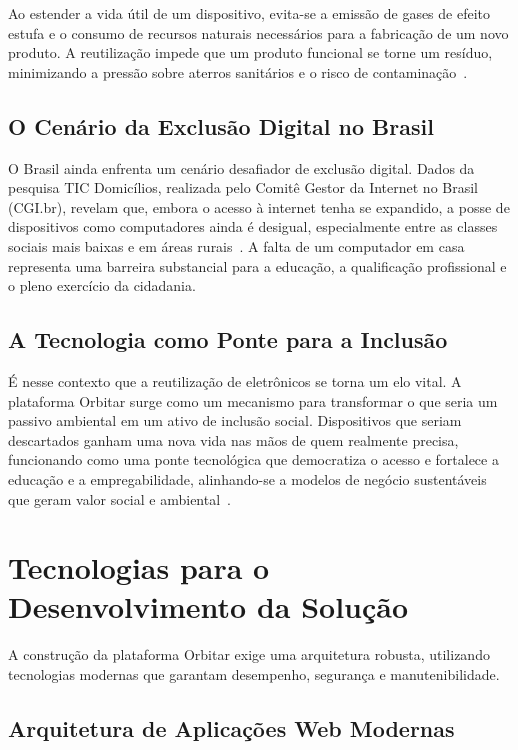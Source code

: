 \documentclass[
	12pt,				%
	openright,			%
	oneside,			%
	a4paper,			%
	english,			%
	brazil				%
	]{abntex2}
\theoremstyle{definition}
\begin{document}
Ao estender a vida útil de um dispositivo, evita-se a emissão de gases de efeito estufa e o consumo de recursos naturais necessários para a fabricação de um novo produto. A reutilização impede que um produto funcional se torne um resíduo, minimizando a pressão sobre aterros sanitários e o risco de contaminação~\cite{Kirchherr2017}.

\subsection{O Cenário da Exclusão Digital no Brasil}

O Brasil ainda enfrenta um cenário desafiador de exclusão digital. Dados da pesquisa TIC Domicílios, realizada pelo Comitê Gestor da Internet no Brasil (CGI.br), revelam que, embora o acesso à internet tenha se expandido, a posse de dispositivos como computadores ainda é desigual, especialmente entre as classes sociais mais baixas e em áreas rurais~\cite{cgi2024}. A falta de um computador em casa representa uma barreira substancial para a educação, a qualificação profissional e o pleno exercício da cidadania.

\subsection{A Tecnologia como Ponte para a Inclusão}

É nesse contexto que a reutilização de eletrônicos se torna um elo vital. A plataforma Orbitar surge como um mecanismo para transformar o que seria um passivo ambiental em um ativo de inclusão social. Dispositivos que seriam descartados ganham uma nova vida nas mãos de quem realmente precisa, funcionando como uma ponte tecnológica que democratiza o acesso e fortalece a educação e a empregabilidade, alinhando-se a modelos de negócio sustentáveis que geram valor social e ambiental~\cite{Geissdoerfer2017}.

\section{Tecnologias para o Desenvolvimento da Solução}


A construção da plataforma Orbitar exige uma arquitetura robusta, utilizando tecnologias modernas que garantam desempenho, segurança e manutenibilidade.

\subsection{Arquitetura de Aplicações Web Modernas}
\end{document}
